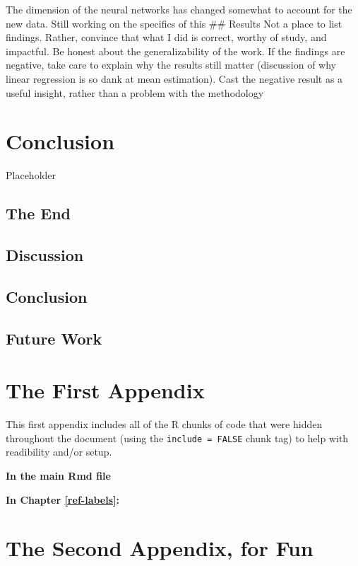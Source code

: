 \documentclass[12pt,twoside]{reedthesis}
\begin{document}
The dimension of the neural networks has changed somewhat to account for
the new data. Still working on the specifics of this \#\# Results Not a
place to list findings. Rather, convince that what I did is correct,
worthy of study, and impactful. Be honest about the generalizability of
the work. If the findings are negative, take care to explain why the
results still matter (discussion of why linear regression is so dank at
mean estimation). Cast the negative result as a useful insight, rather
than a problem with the methodology

\chapter*{Conclusion}\label{conclusion}

Placeholder

\section{The End}\label{the-end}

\section{Discussion}\label{discussion}

\section{Conclusion}\label{conclusion-1}

\section{Future Work}\label{future-work}

\appendix

\chapter{The First Appendix}\label{the-first-appendix}

This first appendix includes all of the R chunks of code that were
hidden throughout the document (using the \texttt{include\ =\ FALSE}
chunk tag) to help with readibility and/or setup.

\textbf{In the main Rmd file}

\textbf{In Chapter \ref{ref-labels}:}

\chapter{The Second Appendix, for
Fun}\label{the-second-appendix-for-fun}
\end{document}

